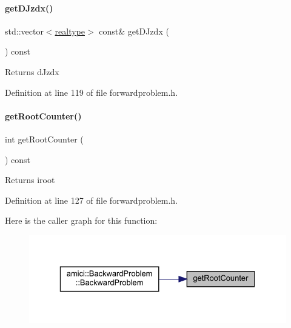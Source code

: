 \paragraph{\texorpdfstring{getDJzdx()}{getDJzdx()}}
{\footnotesize\ttfamily std\+::vector$<$\mbox{\hyperlink{namespaceamici_a1bdce28051d6a53868f7ccbf5f2c14a3}{realtype}}$>$ const\& get\+D\+Jzdx (\begin{DoxyParamCaption}{ }\end{DoxyParamCaption}) const}

\begin{DoxyReturn}{Returns}
d\+Jzdx 
\end{DoxyReturn}


Definition at line 119 of file forwardproblem.\+h.

\mbox{\label{classamici_1_1_forward_problem_a9ba8c1d4ef2ba23e6f4faaaefd28aae9}} 
\paragraph{\texorpdfstring{getRootCounter()}{getRootCounter()}}
{\footnotesize\ttfamily int get\+Root\+Counter (\begin{DoxyParamCaption}{ }\end{DoxyParamCaption}) const}

\begin{DoxyReturn}{Returns}
iroot 
\end{DoxyReturn}


Definition at line 127 of file forwardproblem.\+h.

Here is the caller graph for this function\+:
\nopagebreak
\begin{figure}[H]
\begin{center}
\leavevmode
\includegraphics[width=329pt]{classamici_1_1_forward_problem_a9ba8c1d4ef2ba23e6f4faaaefd28aae9_icgraph}
\end{center}
\end{figure}
\mbox{\label{classamici_1_1_forward_problem_a0efbb7c64b718e9b8b8020acd59afb78}} 
